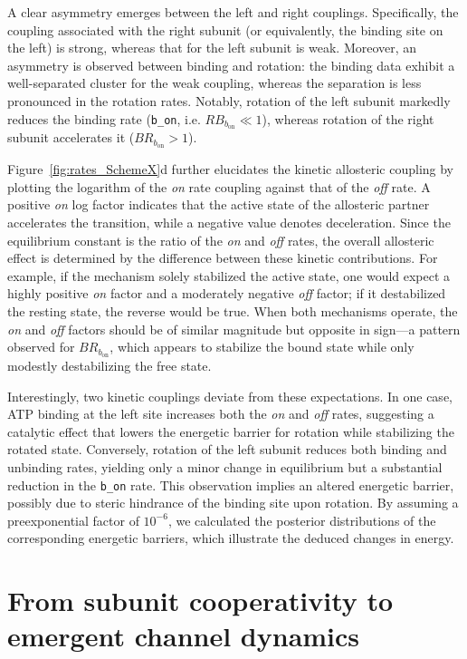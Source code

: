 \documentclass[pdflatex,sn-mathphys-num]{sn-jnl}%
\theoremstyle{thmstyleone}%
\theoremstyle{thmstyletwo}%
\theoremstyle{thmstylethree}%
\begin{document}
A clear asymmetry emerges between the left and right couplings. Specifically, the coupling associated with the right subunit (or equivalently, the binding site on the left) is strong, whereas that for the left subunit is weak. Moreover, an asymmetry is observed between binding and rotation: the binding data exhibit a well-separated cluster for the weak coupling, whereas the separation is less pronounced in the rotation rates. Notably, rotation of the left subunit markedly reduces the binding rate (\texttt{b\_on}, i.e. $RB_{b_{\text{on}}} \ll 1$), whereas rotation of the right subunit accelerates it ($BR_{b_{\text{on}}} > 1$).

Figure~\ref{fig:rates_SchemeX}d further elucidates the kinetic allosteric coupling by plotting the logarithm of the \textit{on} rate coupling against that of the \textit{off} rate. A positive \textit{on} log factor indicates that the active state of the allosteric partner accelerates the transition, while a negative value denotes deceleration. Since the equilibrium constant is the ratio of the \textit{on} and \textit{off} rates, the overall allosteric effect is determined by the difference between these kinetic contributions. For example, if the mechanism solely stabilized the active state, one would expect a highly positive \textit{on} factor and a moderately negative \textit{off} factor; if it destabilized the resting state, the reverse would be true. When both mechanisms operate, the \textit{on} and \textit{off} factors should be of similar magnitude but opposite in sign—a pattern observed for $BR_{b_{\text{on}}}$, which appears to stabilize the bound state while only modestly destabilizing the free state.

Interestingly, two kinetic couplings deviate from these expectations. In one case, ATP binding at the left site increases both the \textit{on} and \textit{off} rates, suggesting a catalytic effect that lowers the energetic barrier for rotation while stabilizing the rotated state. Conversely, rotation of the left subunit reduces both binding and unbinding rates, yielding only a minor change in equilibrium but a substantial reduction in the \texttt{b\_on} rate. This observation implies an altered energetic barrier, possibly due to steric hindrance of the binding site upon rotation. By assuming a preexponential factor of $10^{-6}$, we calculated the posterior distributions of the corresponding energetic barriers, which illustrate the deduced changes in energy.

  

\section{From subunit cooperativity to emergent channel dynamics}
\label{sec:collective}
\end{document}
